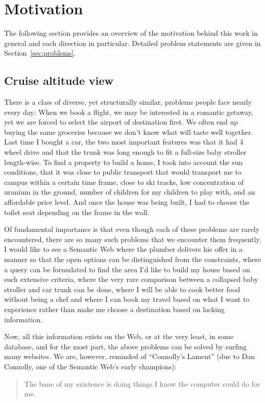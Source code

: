 \section{Motivation}\label{sec:motivation}

The following section provides an overview of the motivation behind
this work in general and each direction in particular. Detailed
problem statements are given in Section~\ref{sec:problems}.

\subsection{Cruise altitude view}

There is a class of diverse, yet structurally similar, problems people
face nearly every day: When we book a flight, we may be interested in
a romantic getaway, yet we are forced to select the airport of
destination first. We often end up buying the same groceries because
we don't know what will taste well together. Last time I bought a car,
the two most important features was that it had 4 wheel drive and that
the trunk was long enough to fit a full-size baby stroller
length-wise. To find a property to build a home, I took into account
the sun conditions, that it was close to public transport that would
transport me to campus within a certain time frame, close to
ski tracks, low concentration of uranium in the ground, number of children for
my children to play with, and an affordable price level. And once the
house was being built, I had to choose the toilet seat depending on
the frame in the wall.

Of fundamental importance is that even though each of these
problems are rarely encountered, there are so many such problems that
we encounter them frequently. I would like to see a Semantic Web
where the plumber delivers his offer in a manner so that the open
options can be distinguished from the constraints, where a query can
be formulated to find the area I'd like to build my house based on
such extensive criteria, where the very rare comparison between a
collapsed baby stroller and car trunk can be done, where I will be
able to cook better food without being a chef and where I can book my
travel based on what I want to experience rather than make me choose a
destination based on lacking information.

Now, all this information exists on the Web, or at the very least, in
some database, and for the most part, the above problems can be
solved by surfing many websites. We are, however, reminded of ``Connolly's
Lament'' (due to Dan Connolly, one of the Semantic Web's early champions):
\begin{quote}
 The bane of my existence is doing things I know the computer could do
 for me.
\end{quote}

